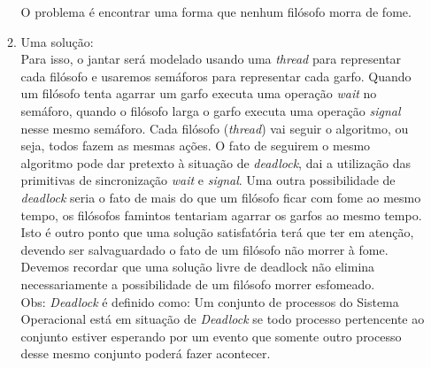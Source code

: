 \documentclass[a4paper, article]{article}
\begin{document}
\begin{enumerate}
\begin{enumerate}
                O problema é encontrar uma forma que nenhum filósofo morra de fome.
                \newpage
                \item Uma solução:\\
                Para isso, o jantar será modelado usando uma \textit{thread} para representar cada filósofo 
                e usaremos semáforos para representar cada garfo. Quando um filósofo tenta agarrar 
                um garfo executa uma operação \textit{wait} no semáforo, quando o filósofo larga o garfo 
                executa uma operação \textit{signal} nesse mesmo semáforo. Cada filósofo (\textit{thread}) 
                vai seguir o algoritmo, ou seja, todos fazem as mesmas ações.
                O fato de seguirem o mesmo algoritmo pode dar pretexto à situação de \textit{deadlock}, dai
                a utilização das primitivas de sincronização \textit{wait} e \textit{signal}. Uma outra possibilidade 
                de \textit{deadlock} seria o fato de mais do que um filósofo ficar com fome ao mesmo tempo,
                os filósofos famintos tentariam agarrar os garfos ao mesmo tempo. Isto é outro ponto que uma
                solução satisfatória terá que ter em atenção, devendo ser salvaguardado o fato de um filósofo
                não morrer à fome. 
                Devemos recordar que uma solução livre de deadlock não elimina necessariamente
                a possibilidade de um filósofo morrer esfomeado.\\

                Obs: \textit{Deadlock} é definido como: Um conjunto de processos do Sistema Operacional está em
                situação de \textit{Deadlock} se todo processo pertencente ao conjunto estiver esperando por um
                evento que somente outro processo desse mesmo conjunto poderá fazer acontecer. 



\end{enumerate}
\end{enumerate}
\end{document}

